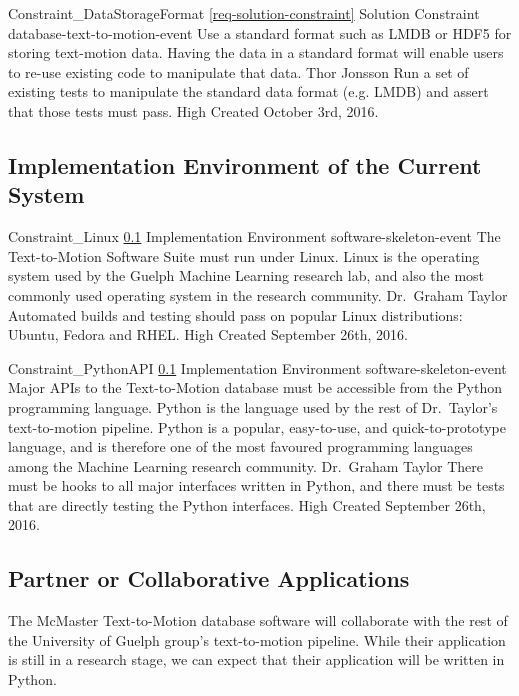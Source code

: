 \documentclass{scrreprt}
\begin{document}
\requirement
{Constraint_DataStorageFormat}
{\ref{req-solution-constraint} Solution Constraint}
{database-text-to-motion-event}
{Use a standard format such as LMDB or HDF5 for storing text-motion data.}
{Having the data in a standard format will enable users to re-use existing code
 to manipulate that data.}
{Thor Jonsson }
{Run a set of existing tests to manipulate the standard data format (e.g. LMDB)
 and assert that those tests must pass.}
{High}
{Created October 3rd, 2016.}

\subsection{Implementation Environment of the Current System}
\label{req-implementation-environment}

\requirement
{Constraint_Linux}
{\ref{req-implementation-environment} Implementation Environment}
{software-skeleton-event}
{The Text-to-Motion Software Suite must run under Linux.}
{Linux is the operating system used by the Guelph Machine Learning research
 lab, and also the most commonly used operating system in the research
 community.}
{Dr.\ Graham Taylor}
{Automated builds and testing should pass on popular Linux distributions:
 Ubuntu, Fedora and RHEL.}
{High}
{Created September 26th, 2016.}

\requirement
{Constraint_PythonAPI}
{\ref{req-implementation-environment} Implementation Environment}
{software-skeleton-event}
{Major APIs to the Text-to-Motion database must be accessible from the Python
 programming language.}
{Python is the language used by the rest of Dr.\ Taylor's text-to-motion
 pipeline. Python is a popular, easy-to-use, and quick-to-prototype language,
 and is therefore one of the most favoured programming languages among the
 Machine Learning research community.}
{Dr.\ Graham Taylor}
{There must be hooks to all major interfaces written in Python, and there must
 be tests that are directly testing the Python interfaces.}
{High}
{Created September 26th, 2016.}

\subsection{Partner or Collaborative Applications}

The McMaster Text-to-Motion database software will collaborate with the rest of
the University of Guelph group's text-to-motion pipeline. While their
application is still in a research stage, we can expect that their application
will be written in Python.
\end{document}
